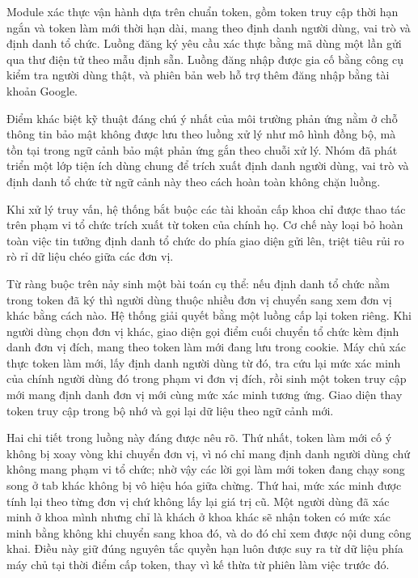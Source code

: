 \documentclass[12pt,a4paper,oneside]{report}
\begin{document}
Module xác thực vận hành dựa trên chuẩn token, gồm token truy cập thời hạn ngắn và token làm mới thời hạn dài, mang theo định danh người dùng, vai trò và định danh tổ chức. Luồng đăng ký yêu cầu xác thực bằng mã dùng một lần gửi qua thư điện tử theo mẫu định sẵn. Luồng đăng nhập được gia cố bằng công cụ kiểm tra người dùng thật, và phiên bản web hỗ trợ thêm đăng nhập bằng tài khoản Google.

Điểm khác biệt kỹ thuật đáng chú ý nhất của môi trường phản ứng nằm ở chỗ thông tin bảo mật không được lưu theo luồng xử lý như mô hình đồng bộ, mà tồn tại trong ngữ cảnh bảo mật phản ứng gắn theo chuỗi xử lý. Nhóm đã phát triển một lớp tiện ích dùng chung để trích xuất định danh người dùng, vai trò và định danh tổ chức từ ngữ cảnh này theo cách hoàn toàn không chặn luồng.

Khi xử lý truy vấn, hệ thống bắt buộc các tài khoản cấp khoa chỉ được thao tác trên phạm vi tổ chức trích xuất từ token của chính họ. Cơ chế này loại bỏ hoàn toàn việc tin tưởng định danh tổ chức do phía giao diện gửi lên, triệt tiêu rủi ro rò rỉ dữ liệu chéo giữa các đơn vị.

Từ ràng buộc trên nảy sinh một bài toán cụ thể: nếu định danh tổ chức nằm trong token đã ký thì người dùng thuộc nhiều đơn vị chuyển sang xem đơn vị khác bằng cách nào. Hệ thống giải quyết bằng một luồng cấp lại token riêng. Khi người dùng chọn đơn vị khác, giao diện gọi điểm cuối chuyển tổ chức kèm định danh đơn vị đích, mang theo token làm mới đang lưu trong cookie. Máy chủ xác thực token làm mới, lấy định danh người dùng từ đó, tra cứu lại mức xác minh của chính người dùng đó trong phạm vi đơn vị đích, rồi sinh một token truy cập mới mang định danh đơn vị mới cùng mức xác minh tương ứng. Giao diện thay token truy cập trong bộ nhớ và gọi lại dữ liệu theo ngữ cảnh mới.

Hai chi tiết trong luồng này đáng được nêu rõ. Thứ nhất, token làm mới cố ý không bị xoay vòng khi chuyển đơn vị, vì nó chỉ mang định danh người dùng chứ không mang phạm vi tổ chức; nhờ vậy các lời gọi làm mới token đang chạy song song ở tab khác không bị vô hiệu hóa giữa chừng. Thứ hai, mức xác minh được tính lại theo từng đơn vị chứ không lấy lại giá trị cũ. Một người dùng đã xác minh ở khoa mình nhưng chỉ là khách ở khoa khác sẽ nhận token có mức xác minh bằng không khi chuyển sang khoa đó, và do đó chỉ xem được nội dung công khai. Điều này giữ đúng nguyên tắc quyền hạn luôn được suy ra từ dữ liệu phía máy chủ tại thời điểm cấp token, thay vì kế thừa từ phiên làm việc trước đó.
\end{document}
